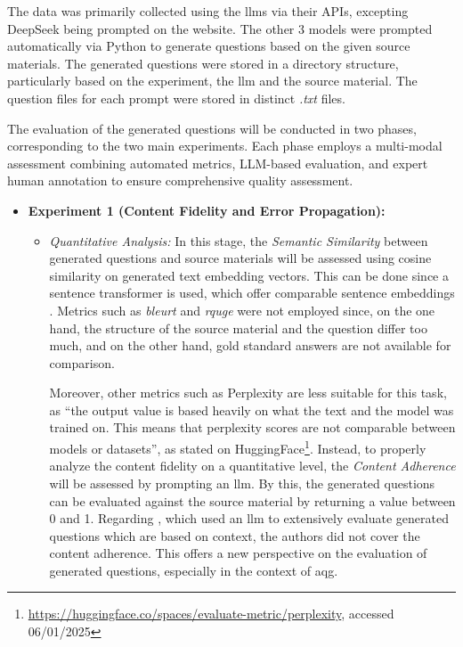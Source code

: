  The data was primarily collected using the \ac{llms} via their APIs, excepting DeepSeek being prompted on the website. The other 3 models were prompted automatically via Python to generate questions based on the given source materials. The generated questions were stored in a directory structure, particularly based on the experiment, the \ac{llm} and the source material. The question files for each prompt were stored in distinct \textit{.txt} files.

 The evaluation of the generated questions will be conducted in two phases, corresponding to the two main experiments. Each phase employs a multi-modal assessment combining automated metrics, LLM-based evaluation, and expert human annotation to ensure comprehensive quality assessment.
\begin{itemize}
    \item \textbf{Experiment 1 (Content Fidelity and Error Propagation):}
    \begin{itemize}
        \item \textit{Quantitative Analysis:} In this stage, the \textit{Semantic Similarity} between generated questions and source materials will be assessed using cosine similarity on generated text embedding vectors. This can be done since a sentence transformer is used, which offer comparable sentence embeddings \cite{reimers_sentence-bert_2019}. Metrics such as \textit{\ac{bleurt}} and \textit{\ac{rquge}} were not employed since, on the one hand, the structure of the source material and the question differ too much, and on the other hand, gold standard answers are not available for comparison.

        \pagebreak
        
        Moreover, other metrics such as Perplexity are less suitable for this task, as \enquote{the output value is based heavily on what the text and the model was trained on. This means that perplexity scores are not comparable between models or datasets}, as stated on HuggingFace\footnote{\url{https://huggingface.co/spaces/evaluate-metric/perplexity}, accessed 06/01/2025}. Instead, to properly analyze the content fidelity on a quantitative level, the \textit{Content Adherence} will be assessed by prompting an \ac{llm}. By this, the generated questions can be evaluated against the source material by returning a value between 0 and 1. Regarding \cite{nguyen_reference-based_2024}, which used an \ac{llm} to extensively evaluate generated questions which are based on context, the authors did not cover the content adherence. This offers a new perspective on the evaluation of generated questions, especially in the context of \ac{aqg}.


\end{itemize}
\end{itemize}
